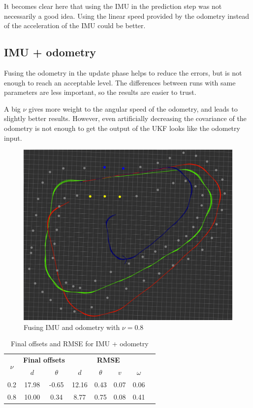 \documentclass[10pt,a4paper, twocolumn]{article}
\begin{document}
It becomes clear here that using the IMU in the prediction step was not necessarily a good idea. Using the linear speed provided by the odometry instead of the acceleration of the IMU could be better.

\subsection{IMU + odometry}
Fusing the odometry in the update phase helps to reduce the errors, but is not enough to reach an acceptable level. The differences between runs with same parameters are less important, so the results are easier to trust.

A big $\nu$ gives more weight to the angular speed of the odometry, and leads to slightly better results. However, even artificially decreasing the covariance of the odometry is not enough to get the output of the UKF looks like the odometry input.

\begin{figure}[h]
	\centering
	\includegraphics[width=\columnwidth]{images/odom2.png}
	\caption{Fusing IMU and odometry with $\nu=0.8$}
	\label{fig:odom}
\end{figure}

\begin{table}[h]
	\begin{center}
		\begin{tabular}{|c|c|c|c|c|c|c|c|}
			\hline
			\multirow{2}{*}{\textbf{$\nu$}} & \multicolumn{2}{c|}{\textbf{Final offsets}} &  \multicolumn{4}{c|}{\textbf{RMSE}} \\ \cline{2-7}
			  & $d$ & $\theta$ & $d$ & $\theta$ & $v$ & $\omega$ \\ \hline
			0.2 & 17.98 & -0.65 & 12.16 & 0.43 & 0.07 & 0.06 \\
			0.8 & 10.00 & 0.34 & 8.77 & 0.75 & 0.08 & 0.41 \\
			\hline
			
		\end{tabular}
		\caption{Final offsets and RMSE for IMU + odometry}
		\label{table:odom}
	\end{center}	
\end{table}
\end{document}
